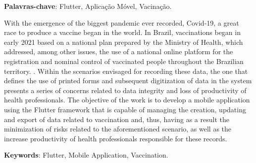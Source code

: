 
\vspace{1.5ex}

{\bf Palavras-chave}: Flutter, Aplicação Móvel, Vacinação.

%
%

With the emergence of the biggest pandemic ever recorded, Covid-19, a great race to produce a vaccine began in the world. In Brazil, vaccinations began in early 2021 based on a national plan prepared by the Ministry of Health, which addressed, among other issues, the use of a national online platform for the registration and nominal control of vaccinated people throughout the Brazilian territory. . Within the scenarios envisaged for recording these data, the one that defines the use of printed forms and subsequent digitization of data in the system presents a series of concerns related to data integrity and loss of productivity of health professionals. The objective of the work is to develop a mobile application using the Flutter framework that is capable of managing the creation, updating and export of data related to vaccination and, thus, having as a result the minimization of risks related to the aforementioned scenario, as well as the increase productivity of health professionals responsible for these records.

\vspace{1.5ex}

{\bf Keywords}: Flutter, Mobile Application, Vaccination.
